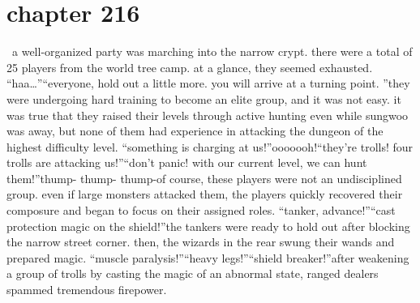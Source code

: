 \section{chapter 216}






 a well-organized party was marching into the narrow crypt.
 there were a total of 25 players from the world tree camp.
 at a glance, they seemed exhausted.
“haa…”“everyone, hold out a little more.
 you will arrive at a turning point.
”they were undergoing hard training to become an elite group, and it was not easy.
it was true that they raised their levels through active hunting even while sungwoo was away, but none of them had experience in attacking the dungeon of the highest difficulty level.
“something is charging at us!”ooooooh!“they’re trolls! four trolls are attacking us!”“don’t panic! with our current level, we can hunt them!”thump- thump- thump-of course, these players were not an undisciplined group.
 even if large monsters attacked them, the players quickly recovered their composure and began to focus on their assigned roles.
“tanker, advance!”“cast protection magic on the shield!”the tankers were ready to hold out after blocking the narrow street corner.
 then, the wizards in the rear swung their wands and prepared magic.
“muscle paralysis!”“heavy legs!”“shield breaker!”after weakening a group of trolls by casting the magic of an abnormal state, ranged dealers spammed tremendous firepower.

